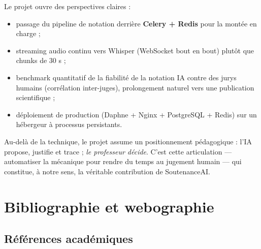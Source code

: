 \documentclass[12pt,a4paper]{report}
\begin{document}
Le projet ouvre des perspectives claires :
\begin{itemize}
  \item passage du pipeline de notation derrière \textbf{Celery + Redis} pour
        la montée en charge ;
  \item streaming audio continu vers Whisper (WebSocket bout en bout) plutôt
        que chunks de 30 s ;
  \item benchmark quantitatif de la fiabilité de la notation IA contre des
        jurys humains (corrélation inter-juges), prolongement naturel vers une
        publication scientifique ;
  \item déploiement de production (Daphne + Nginx + PostgreSQL + Redis) sur un
        hébergeur à processus persistants.
\end{itemize}

Au-delà de la technique, le projet assume un positionnement pédagogique :
l'IA propose, justifie et trace ; \emph{le professeur décide}. C'est cette
articulation --- automatiser la mécanique pour rendre du temps au jugement
humain --- qui constitue, à notre sens, la véritable contribution de
SoutenanceAI.

\chapter*{Bibliographie et webographie}

\section*{Références académiques}
\end{document}
